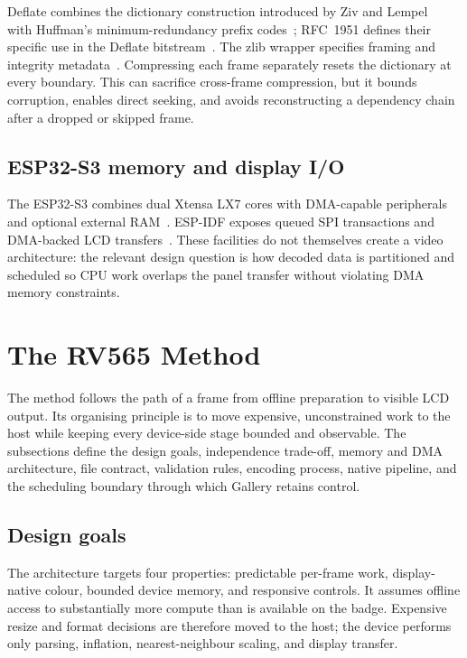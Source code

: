 \documentclass[11pt,twocolumn]{article}
\newcommand{\system}{RV565}
\begin{document}
Deflate combines the dictionary construction introduced by Ziv and
Lempel~\cite{ziv1977universal} with Huffman's minimum-redundancy prefix
codes~\cite{huffman1952method}; RFC~1951 defines their specific use in the
Deflate bitstream~\cite{deutsch1996deflate}.  The zlib wrapper specifies
framing and integrity metadata~\cite{deutsch1996zlib}.  Compressing each frame
separately resets the
dictionary at every boundary.  This can sacrifice cross-frame compression,
but it bounds corruption, enables direct seeking, and avoids reconstructing a
dependency chain after a dropped or skipped frame.

\subsection{ESP32-S3 memory and display I/O}

The ESP32-S3 combines dual Xtensa LX7 cores with DMA-capable peripherals and
optional external RAM~\cite{espressif2023datasheet}.  ESP-IDF exposes queued
SPI transactions and DMA-backed LCD transfers~\cite{espressif2026spi}.  These
facilities do not themselves create a video architecture: the relevant design
question is how decoded data is partitioned and scheduled so CPU work overlaps
the panel transfer without violating DMA memory constraints.

\section{The \system{} Method}

The method follows the path of a frame from offline preparation to visible LCD
output.  Its organising principle is to move expensive, unconstrained work to
the host while keeping every device-side stage bounded and observable.  The
subsections define the design goals, independence trade-off, memory and DMA
architecture, file contract, validation rules, encoding process, native
pipeline, and the scheduling boundary through which Gallery retains control.

\subsection{Design goals}

The architecture targets four properties: predictable per-frame work,
display-native colour, bounded device memory, and responsive controls.  It
assumes offline access to substantially more compute than is available on the
badge.  Expensive resize and format decisions are therefore moved to the host;
the device performs only parsing, inflation, nearest-neighbour scaling, and
display transfer.
\end{document}
